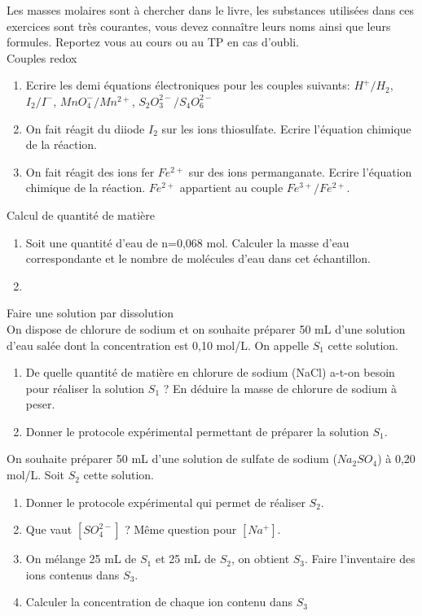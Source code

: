 

Les masses molaires sont à chercher dans le livre, les substances utilisées dans ces exercices sont très courantes, vous devez connaître leurs noms ainsi que leurs formules. Reportez vous au cours ou au TP en cas d'oubli.\\
\exo Couples redox
\begin{enumerate}
\item Ecrire les demi équations électroniques pour les couples suivants: $H^+/H_2$, $I_2/I^-$, $MnO_4^-/Mn^{2+}$, $S_2O_3^{2-}/S_4O_6^{2-}$
\item On fait réagit  du diiode $I_2$ sur les ions thiosulfate. Ecrire l'équation chimique de la réaction.
\item  On fait réagit des ions fer $Fe^{2+}$ sur des ions permanganate. Ecrire l'équation chimique de la réaction. $Fe^{2+}$ appartient au couple $Fe^{3+}/Fe^{2+}$.
\end{enumerate}
\exo Calcul de quantité de matière
\begin{enumerate}
\item Soit une quantité d'eau de n=0,068 mol. Calculer la masse d'eau correspondante et le nombre de molécules d'eau dans cet échantillon.
\item 
\end{enumerate}
\exo Faire une solution par dissolution\\
On dispose de chlorure de sodium et on souhaite préparer  50 mL d'une solution d'eau salée dont la concentration est 0,10 mol/L. On appelle $S_1$ cette solution.
\begin{enumerate}
\item De quelle quantité de matière en chlorure de sodium (NaCl) a-t-on besoin pour réaliser la solution $S_1$ ? En déduire la masse de chlorure de sodium à peser.
\item Donner le protocole expérimental permettant de préparer la solution $S_1$.
\end{enumerate}

On souhaite préparer 50 mL d'une solution de sulfate de sodium ($Na_2SO_4$) à 0,20 mol/L. Soit $S_2$ cette solution.
\begin{enumerate}
\item Donner le protocole expérimental qui permet de réaliser $S_2$.
\item Que vaut $[SO_4^{2-}]$ ? Même question pour $[Na^+]$.
\item On mélange 25 mL de $S_1$ et 25 mL de $S_2$, on obtient $S_3$. Faire l'inventaire des ions contenus dans $S_3$.
\item Calculer la concentration de chaque ion contenu dans $S_3$
\end{enumerate}


